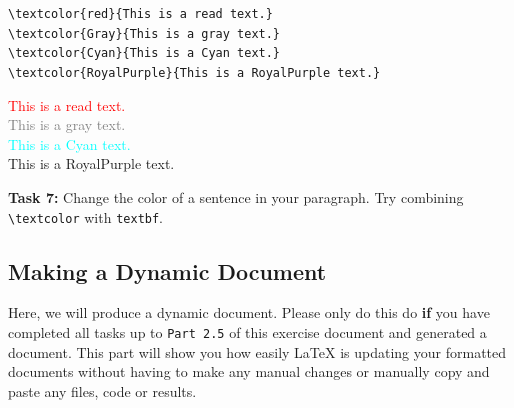 \documentclass[12pts]{article}
\begin{document}
	\clearpage
	\begin{center}
		\begin{multicols}{2}
			\verb|\textcolor{red}{This is a read text.}| \\
			\verb|\textcolor{Gray}{This is a gray text.}| \\
			\verb|\textcolor{Cyan}{This is a Cyan text.}| \\
			\verb|\textcolor{RoyalPurple}{This is a RoyalPurple text.}|
			
			\columnbreak
			
			\textcolor{red}{This is a read text.} \\
			\textcolor{Gray}{This is a gray text.} \\
			\textcolor{Cyan}{This is a Cyan text.} \\
			\textcolor{RoyalPurple}{This is a RoyalPurple text.}
		\end{multicols}
	\end{center}
	
	\textcolor{BurntOrange}{\textbf{Task 7:}} Change the color of a sentence in your paragraph. Try combining \verb|\textcolor| with \verb|textbf|.
		
	
	\subsection{Making a Dynamic Document}
	
	Here, we will produce a dynamic document. Please only do this do \textbf{if} you have completed all tasks up to \texttt{Part 2.5} of this exercise document and generated a document. This part will show you how easily {\LaTeX} is updating your formatted documents without having to make any manual changes or manually copy and paste any files, code or results.
	
\end{document}
